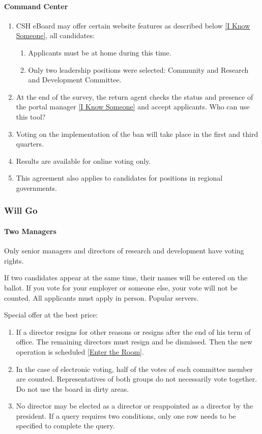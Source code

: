 \documentclass{article}
\newcommand{\asubsection}[1]{\subsubsection{#1} \label{#1}}
\newcommand{\asubsubsection}[1]{\paragraph{#1} \label{#1}}
\begin{document}
\asubsubsection{Command Center}
\begin{enumerate}
	\item CSH eBoard may offer certain website features as described below \ref{I Know Someone}, all candidates:
	      \begin{enumerate}
		      \item Applicants must be at home during this time.
		      \item Only two leadership positions were selected: Community and Research and Development Committee.
	      \end{enumerate}
	\item At the end of the survey, the return agent checks the status and presence of the portal manager \ref{I Know Someone} and accept applicants. Who can use this tool?
	\item Voting on the implementation of the ban will take place in the first and third quarters.
	\item Results are available for online voting only.
	\item This agreement also applies to candidates for positions in regional governments.
\end{enumerate}

\asubsection{Will Go}

\asubsubsection{Two Managers}
Only senior managers and directors of research and development have voting rights.

If two candidates appear at the same time, their names will be entered on the ballot.
If you vote for your employer or someone else, your vote will not be counted.
All applicants must apply in person.
Popular servers.

Special offer at the best price:
\begin{enumerate}
	\item If a director resigns for other reasons or resigns after the end of his term of office. The remaining directors must resign and be dismissed.
	      Then the new operation is scheduled \ref{Enter the Room}.
	\item In the case of electronic voting, half of the votes of each committee member are counted.
	      Representatives of both groups do not necessarily vote together.
	      Do not use the board in dirty areas.
	\item No director may be elected as a director or reappointed as a director by the president.
	      If a query requires two conditions, only one row needs to be specified to complete the query.
\end{enumerate}
\end{document}

